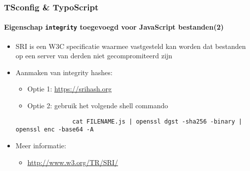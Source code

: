 \begin{frame}[fragile]
	\frametitle{TSconfig \& TypoScript}
	\framesubtitle{Eigenschap \texttt{integrity} toegevoegd voor JavaScript bestanden(2)}


	\begin{itemize}

		\item SRI is een W3C specificatie waarmee vastgesteld kan worden dat bestanden op een server
		 	van derden niet gecompromiteerd zijn

		\item Aanmaken van integrity hashes:

			\begin{itemize}
				\item Optie 1: \url{https://srihash.org}
				\item Optie 2: gebruik het volgende shell commando
			\end{itemize}

			\begin{lstlisting}
				cat FILENAME.js | openssl dgst -sha256 -binary | openssl enc -base64 -A
			\end{lstlisting}

		\item Meer informatie:

			\begin{itemize}
				\item \url{http://www.w3.org/TR/SRI/}
			\end{itemize}

	\end{itemize}

\end{frame}


